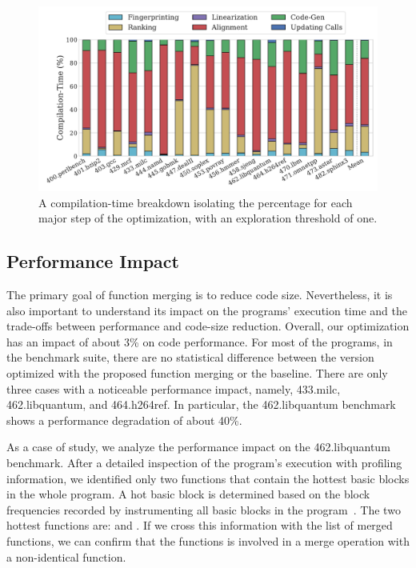 \begin{figure}[th]
  \hspace{-2ex}
  \includegraphics[width=1.05\linewidth]{figs/compilation-time-breakdown-sqrd.pdf}
  \caption{A compilation-time breakdown isolating the percentage for each major
           step of the optimization, with an exploration threshold of one.}
  \label{fig:compilation-time-breakdown}
\end{figure}


\subsection{Performance Impact}


The primary goal of function merging is to reduce code size.
Nevertheless, it is also important to understand its impact on the programs'
execution time and the trade-offs between performance and code-size reduction.
Overall, our optimization has an impact of about 3\% on code performance.
For most of the programs, in the benchmark suite, there are no
statistical difference between the version optimized with the proposed function
merging or the baseline.
There are only three cases with a noticeable performance impact, namely,
433.milc, 462.libquantum, and 464.h264ref.
In particular, the 462.libquantum benchmark shows a performance degradation of
about 40\%.

As a case of study, we analyze the performance impact on the 462.libquantum
benchmark.
After a detailed inspection of the program's execution with profiling
information, we identified only two functions that contain the hottest basic
blocks in the whole program.
A hot basic block is determined based on the block frequencies recorded by
instrumenting all basic blocks in the program~\cite{ball94}.
The two hottest functions are:  and
.
If we cross this information with the list of merged functions, we can confirm
that the functions  is involved in a merge operation with
a non-identical function.

